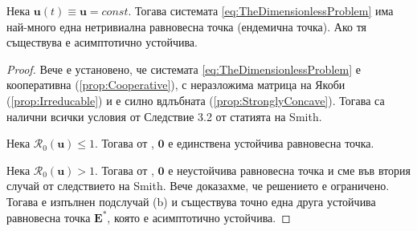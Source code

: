 \begin{proposition}
  Нека $\mathbf{u}(t)\equiv \mathbf{u}=const$. Тогава системата \eqref{eq:TheDimensionlessProblem} има най-много една нетривиална равновесна точка (ендемична точка).
  Ако тя съществува е асимптотично устойчива.
\end{proposition}

\begin{proof}
  Вече е установено, че системата \eqref{eq:TheDimensionlessProblem} е кооперативна (\eqref{prop:Cooperative}), с неразложима матрица на Якоби (\eqref{prop:Irreducable}) и е силно вдлъбната (\eqref{prop:StronglyConcave}). Тогава са налични всички условия от Следствие 3.2 от статията \cite{Smith1986} на Smith.

  Нека $\mathscr{R}_0(\mathbf{u}) \leq 1$. Тогава от \cite{Driessche2002}, $\mathbf{0}$ е единствена устойчива равновесна точка.

  Нека $\mathscr{R}_0(\mathbf{u}) > 1$. Тогава от \cite{Driessche2002}, $\mathbf{0}$ е неустойчива равновесна точка и сме във втория случай от следствието на Smith. Вече доказахме, че решението е ограничено. Тогава е изпълнен подслучай (b) и съществува точно една друга устойчива равновесна точка $\mathbf{E}^*$, която е асимптотично устойчива.
\end{proof}


